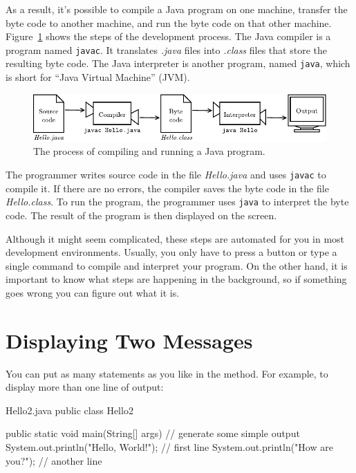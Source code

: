
As a result, it's possible to compile a Java program on one machine, transfer the byte code to another machine, and run the byte code on that other machine.
Figure~\ref{fig.compiler} shows the steps of the development process.
The Java compiler is a program named {\tt javac}.
It translates {\it .java} files into {\it .class} files that store the resulting byte code.
The Java interpreter is another program, named {\tt java}, which is short for ``Java Virtual Machine'' (JVM).

\begin{figure}[!ht]
\begin{center}
\includegraphics{figs/compiler.pdf}
\caption{The process of compiling and running a Java program.}
\label{fig.compiler}
\end{center}
\end{figure}

The programmer writes source code in the file {\it Hello.java} and uses {\tt javac} to compile it.
If there are no errors, the compiler saves the byte code in the file {\it Hello.class}.
To run the program, the programmer uses {\tt java} to interpret the byte code.
The result of the program is then displayed on the screen.

Although it might seem complicated, these steps are automated for you in most development environments.
Usually, you only have to press a button or type a single command to compile and interpret your program.
On the other hand, it is important to know what steps are happening in the background, so if something goes wrong you can figure out what it is.


\section{Displaying Two Messages}

You can put as many statements as you like in the  method.
For example, to display more than one line of output:

\begin{trinket}[250]{Hello2.java}
public class Hello2 {

    public static void main(String[] args) {
        // generate some simple output
        System.out.println("Hello, World!");  // first line
        System.out.println("How are you?");   // another line
    }
}
\end{trinket}

